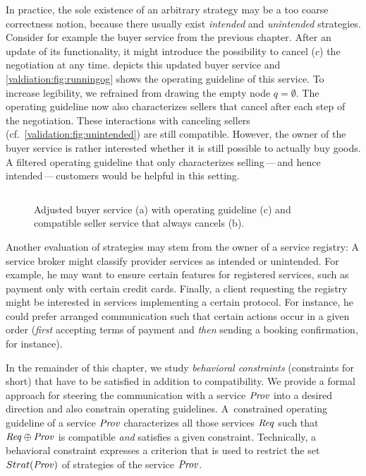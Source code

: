 In practice, the sole existence of an arbitrary strategy may be a too coarse correctness notion, because there usually exist \emph{intended} and \emph{unintended} strategies. Consider for example the buyer service from the previous chapter. After an update of its functionality, it might introduce the possibility to cancel ($c$) the negotiation at any time.  depicts this updated buyer service and \autoref{valdiation:fig:runningog} shows the operating guideline of this service. To increase legibility, we refrained from drawing the empty node $q=\emptyset$. The operating guideline now also characterizes sellers that cancel after each step of the negotiation. These interactions with canceling sellers (cf.~\autoref{validation:fig:unintended}) are still compatible. However, the owner of the buyer service is rather interested whether it is still possible to actually buy goods. A filtered operating guideline that only characterizes selling\,---\,and hence intended\,---\,customers would be helpful in this setting.

\begin{figure}
\centering
{}\hfill
{}\hfill
{}\hfill ${}$
\caption{Adjusted buyer service (a) with operating guideline (c) and compatible seller service that always cancels (b).}
\label{validation:fig:buyer2}
\end{figure}

Another evaluation of strategies may stem from the owner of a service registry: A service broker might classify provider services as intended or unintended. For example, he may want to ensure certain features for registered services, such as payment only with certain credit cards. Finally, a client requesting the registry might be interested in services implementing a certain protocol. For instance, he could prefer arranged communication such that certain actions occur in a given order (\emph{first} accepting terms of payment and \emph{then} sending a booking confirmation, for instance).

In the remainder of this chapter, we study \emph{behavioral constraints} (constraints for short) that have to be satisfied in addition to compatibility. We provide a formal approach for steering the communication with a service $\mathit{Prov}$ into a desired direction and also constrain operating guidelines. A~constrained operating guideline of a service $\mathit{Prov}$ characterizes all those services $\mathit{Req}$ such that $\mathit{Req}\oplus \mathit{Prov}$ is compatible \emph{and} satisfies a given constraint. Technically, a behavioral constraint expresses a criterion that is used to restrict the set $\mathop{Strat}(\mathit{Prov})$ of strategies of the service $\mathit{Prov}$.

